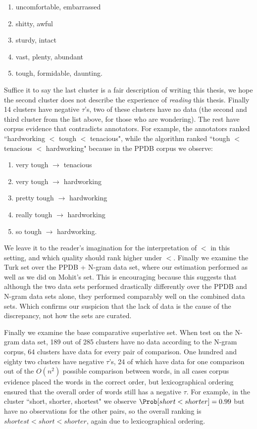 \begin{enumerate}
	\item uncomfortable, embarrassed
	\item shitty, awful
	\item sturdy, intact
	\item vast, plenty, abundant
	\item tough, formidable, daunting.
\end{enumerate}

Suffice it to say the last cluster is a fair description of writing this thesis, we hope the second cluster does not describe the experience of \textit{reading} this thesis. Finally 14 clusters have negative $\tau$'s, two of these clusters have no data (the second and third cluster from the list above, for those who are wondering). The rest have corpus evidence that contradicts annotators. For example, the annotators ranked ``hardworking $<$ tough $<$ tenacious", while the algorithm ranked ``tough $<$ tenacious $<$ hardworking" because in the PPDB corpus we observe:

\begin{enumerate}
	\item very tough $\rightarrow$ tenacious
	\item very tough $\rightarrow$ hardworking
	\item pretty tough $\rightarrow$ hardworking
	\item really tough $\rightarrow$ hardworking
	\item so tough $\rightarrow$ hardworking.
\end{enumerate}

We leave it to the reader's imagination for the interpretation of $<$ in this setting, and which quality should rank higher under $<$. Finally we examine the Turk set over the PPDB + N-gram data set, where our estimation performed as well as we did on Mohit's set. This is encouraging because this suggests that although the two data sets performed drastically differently over the PPDB and N-gram data sets alone, they performed comparably well on the combined data sets. Which confirms our suspicion that the lack of data is the cause of the discrepancy, not how the sets are curated. 

Finally we examine the base comparative superlative set. When test on the N-gram data set, 189 out of 285 clusters have no data according to the N-gram corpus, 64 clusters have data for every pair of comparison. One hundred and eighty two clusters have negative $\tau$'s, 24 of which have data for one comparison out of the $O(n^2)$ possible comparison between words, in all cases corpus evidence placed the words in the correct order, but lexicographical ordering ensured that the overall order of words still has a negative $\tau$. For example, in the cluster ``short, shorter, shortest" we observe $\Prob[ short < shorter ] = 0.99$ but have no observations for the other pairs, so the overall ranking is $shortest < short < shorter$, again due to lexicographical ordering.


